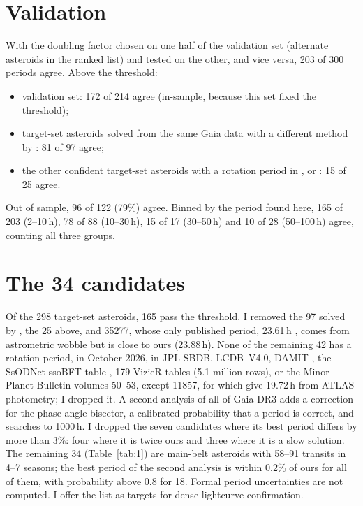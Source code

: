 \documentclass[RNAAS]{aastex631}
\begin{document}
\section{Validation}

With the doubling factor chosen on one half of the validation set (alternate asteroids in the ranked list)
and tested on the other, and vice versa, 203 of 300 periods agree. Above the threshold:
\begin{itemize}
\item validation set: 172 of 214 agree (in-sample, because this set fixed the threshold);
\item target-set asteroids solved from the same Gaia data with a different method by \citet{Durech2023}:
81 of 97 agree;
\item the other confident target-set asteroids with a rotation period in \citet{Cellino2024},
\citet{MacLennan2026} or \citet{McNeill2023}: 15 of 25 agree.
\end{itemize}
Out of sample, 96 of 122 (79\%) agree. Binned by the period found here, 165 of 203 (2--10\,h), 78 of 88
(10--30\,h), 15 of 17 (30--50\,h) and 10 of 28 (50--100\,h) agree, counting all three groups.

\section{The 34 candidates}

Of the 298 target-set asteroids, 165 pass the threshold. I removed the 97 solved by \citet{Durech2023}, the
25 above, and 35277, whose only published period, 23.61\,h \citep{Liberato2024}, comes from astrometric
wobble but is close to ours (23.88\,h). None of the remaining 42 has a rotation period, in October 2026, in
JPL SBDB, LCDB~V4.0, DAMIT \citep{Durech2010}, the SsODNet ssoBFT table \citep{Berthier2023}, 179 VizieR
tables (5.1 million rows), or the Minor Planet Bulletin volumes 50--53, except 11857, for which
\citet{Durech2022} give 19.72\,h from ATLAS photometry; I dropped it. A second analysis of all of Gaia DR3
\citep{Tropynin2026b} adds a correction for the phase-angle bisector, a calibrated probability that a period
is correct, and searches to 1000\,h. I dropped the seven candidates where its best period differs by more
than 3\%: four where it is twice ours and three where it is a slow solution. The remaining 34
(Table~\ref{tab:1}) are main-belt asteroids with 58--91 transits in 4--7 seasons; the best period of the
second analysis is within 0.2\% of ours for all of them, with probability above 0.8 for 18. Formal period
uncertainties are not computed. I offer the list as targets for dense-lightcurve confirmation.
\end{document}
